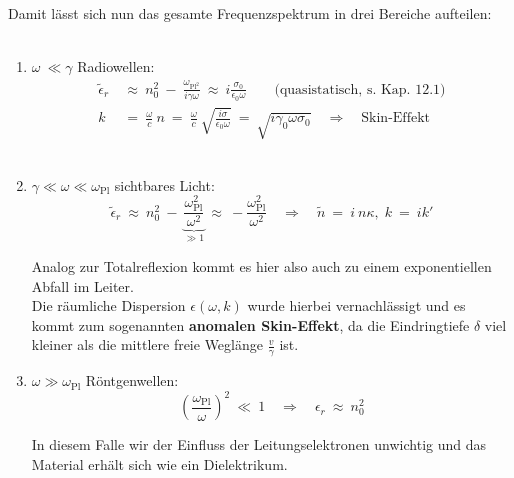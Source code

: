 \ \\
Damit lässt sich nun das gesamte Frequenzspektrum  in drei Bereiche aufteilen:\\
\ \\
\begin{enumerate}[label=\roman*)]
\item \underline{$\omega \ \ll \gamma$} \qquad\qquad\qquad \; Radiowellen:\\

\begin{align*}
\tilde{\epsilon}_r \ &\approx \ n_0^2 \ - \ \frac{\omega_{\text{Pl}^2}}{i\gamma\omega} \ \approx \ i \frac{\sigma_0}{\epsilon_0\omega} \qquad \text{(quasistatisch, s. Kap. 12.1)}\\
k \ &= \ \frac{\omega}{c} \ n  \ = \ \frac{\omega}{c} \ \sqrt{\frac{i\sigma}{\epsilon_0\omega}} \ = \ \sqrt{i\gamma_0\omega\sigma_0} \quad \Rightarrow \quad \text{Skin-Effekt}
\end{align*}
\ \\

\item \underline{$\gamma\ll\omega\ll\omega_{\text{Pl}}$} \qquad \qquad sichtbares Licht:\\

\begin{equation*}
\tilde{\epsilon}_r \ \approx \ n_0^2 \ - \ \underbrace{\frac{\omega_{\text{Pl}}^2}{\omega^2}}_{\gg 1} \ \approx \ - \frac{\omega_{\text{Pl}}^2}{\omega^2} \quad \Rightarrow\quad \tilde{n} \ = \ i \ n \kappa, \; k \ = \ i k'
\end{equation*}
 
Analog zur Totalreflexion kommt es hier also auch zu einem exponentiellen Abfall im Leiter.\\
Die räumliche Dispersion $\epsilon(\omega,k)$ wurde hierbei vernachlässigt und es kommt zum sogenannten \textbf{anomalen Skin-Effekt}, da die Eindringtiefe $\delta$ viel kleiner als die mittlere freie Weglänge $\frac{v}{\gamma}$ ist.\\ 

\item \underline{$\omega \gg \omega_{\text{Pl}}$} \qquad\qquad\qquad Röntgenwellen:\\
\begin{equation*}
\left(\frac{\omega_{\text{Pl}}}{\omega}\right)^2 \ \ll \ 1 \quad\Rightarrow\quad \epsilon_r \ \approx \ n_0^2
\end{equation*}

In diesem Falle wir der Einfluss der Leitungselektronen unwichtig und das Material erhält sich wie ein Dielektrikum.
\end{enumerate}

